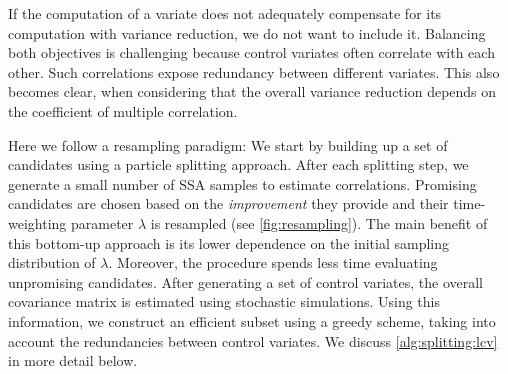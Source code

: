 
If the computation of a variate does not adequately compensate for
its computation
with variance reduction, we do not want to include it.
Balancing both objectives is challenging because control variates
often correlate with each other.
Such correlations expose redundancy between different variates.
This also becomes clear, when considering that the overall variance
reduction  depends on
the coefficient of multiple correlation.

Here we follow a resampling paradigm:
We start by building up a set of candidates using a particle splitting approach.
After each splitting step, we generate a small number of \ac{SSA}
samples to estimate correlations.
Promising candidates are chosen based on the \emph{improvement} they
provide and their time-weighting parameter $\lambda$ is resampled
(see \autoref{fig:resampling}).
The main benefit of this bottom-up approach is its lower dependence
on the initial sampling distribution of $\lambda$.
Moreover, the procedure spends less time evaluating unpromising candidates.
After   generating a set of control variates, the overall covariance
matrix is estimated using stochastic simulations.
Using this information, we construct an efficient subset using a
greedy scheme, taking into account the redundancies between control variates.
We discuss \autoref{alg:splitting:lcv} in more detail below.

